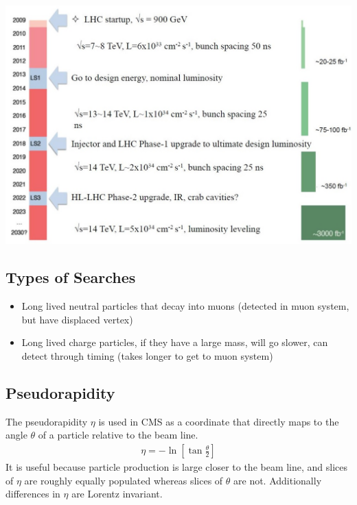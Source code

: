 \includegraphics[width=1.0\textwidth]{physics/images/lhc_timeline}


\subsection{Types of Searches}
\begin{itemize}
    \item Long lived neutral particles that decay into muons (detected in muon system, but have displaced vertex)
    \item Long lived charge particles, if they have a large mass, will go slower, can detect through timing (takes longer to get to muon system)
\end{itemize}

\subsection{Pseudorapidity}
The pseudorapidity $\eta$ is used in CMS as a coordinate that directly maps to the angle $\theta$ of a particle relative to the beam line.
\begin{align}
\eta = -\ln\left[\tan\frac{\theta}{2}\right]
\end{align}
It is useful because particle production is large closer to the beam line, and slices of $\eta$ are roughly equally populated whereas slices of $\theta$ are not. Additionally differences in $\eta$ are Lorentz invariant.
